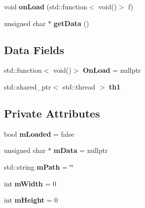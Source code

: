 \begin{DoxyCompactItemize}
\item 
void {\bfseries on\+Load} (std\+::function$<$ void()$>$ f)\hypertarget{class_i_o_1_1_image_1_1_image_af7422a0799029301e1788a1feab10998}{}\label{class_i_o_1_1_image_1_1_image_af7422a0799029301e1788a1feab10998}

\item 
unsigned char $\ast$ {\bfseries get\+Data} ()\hypertarget{class_i_o_1_1_image_1_1_image_ac40aed74c1c40aedcec355443164b303}{}\label{class_i_o_1_1_image_1_1_image_ac40aed74c1c40aedcec355443164b303}

\end{DoxyCompactItemize}
\subsection*{Data Fields}
\begin{DoxyCompactItemize}
\item 
std\+::function$<$ void()$>$ {\bfseries On\+Load} = nullptr\hypertarget{class_i_o_1_1_image_1_1_image_a179048eccc6df5d42d06106b9a9f4e80}{}\label{class_i_o_1_1_image_1_1_image_a179048eccc6df5d42d06106b9a9f4e80}

\item 
std\+::shared\+\_\+ptr$<$ std\+::thread $>$ {\bfseries th1}\hypertarget{class_i_o_1_1_image_1_1_image_a4e40dcbffacded80f3b077e43a24aec1}{}\label{class_i_o_1_1_image_1_1_image_a4e40dcbffacded80f3b077e43a24aec1}

\end{DoxyCompactItemize}
\subsection*{Private Attributes}
\begin{DoxyCompactItemize}
\item 
bool {\bfseries m\+Loaded} = false\hypertarget{class_i_o_1_1_image_1_1_image_ae7de8af3717796c8c86c8d1cb31ed2a2}{}\label{class_i_o_1_1_image_1_1_image_ae7de8af3717796c8c86c8d1cb31ed2a2}

\item 
unsigned char $\ast$ {\bfseries m\+Data} = nullptr\hypertarget{class_i_o_1_1_image_1_1_image_a1be4ab27ddce7814942bbccd097bc9b6}{}\label{class_i_o_1_1_image_1_1_image_a1be4ab27ddce7814942bbccd097bc9b6}

\item 
std\+::string {\bfseries m\+Path} = \char`\"{}\char`\"{}\hypertarget{class_i_o_1_1_image_1_1_image_a597d7b71a0ceb9c95bf6466d23c7c475}{}\label{class_i_o_1_1_image_1_1_image_a597d7b71a0ceb9c95bf6466d23c7c475}

\item 
int {\bfseries m\+Width} = 0\hypertarget{class_i_o_1_1_image_1_1_image_a2e11c19dab536fa7575be8930d98676a}{}\label{class_i_o_1_1_image_1_1_image_a2e11c19dab536fa7575be8930d98676a}

\item 
int {\bfseries m\+Height} = 0\hypertarget{class_i_o_1_1_image_1_1_image_a8805b40269a0ea9014448eee65406eed}{}\label{class_i_o_1_1_image_1_1_image_a8805b40269a0ea9014448eee65406eed}

\end{DoxyCompactItemize}


